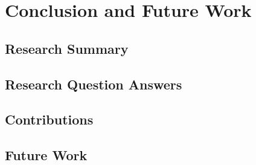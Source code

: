 \chapter{Conclusion and Future Work}
\label{ch:conclusion}
\section{Research Summary}
\mbox{}\par
\section{Research Question Answers}
\mbox{}\par
\section{Contributions}
\mbox{}\par
\section{Future Work}
\mbox{}\par
